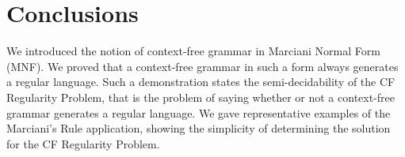 \section{Conclusions}
\label{sec:conclusions}

We introduced the notion of context-free grammar in Marciani Normal Form (MNF).
We proved that a context-free grammar in such a form always generates a regular language.
Such a demonstration states the semi-decidability of the CF Regularity Problem, that is the problem of saying whether or not a context-free grammar generates a regular language.
We gave representative examples of the Marciani's Rule application, showing the simplicity of determining the solution for the CF Regularity Problem.

